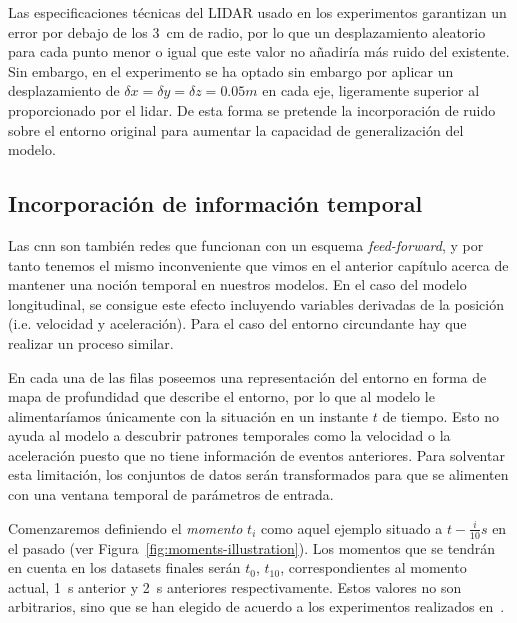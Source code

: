 Las especificaciones técnicas del LIDAR usado en los experimentos garantizan un error por debajo de los \SI{3}{\cm} de radio, por lo que un desplazamiento aleatorio para cada punto menor o igual que este valor no añadiría más ruido del existente. Sin embargo, en el experimento se ha optado sin embargo por aplicar un desplazamiento de $\delta x = \delta y = \delta z = 0.05m$ en cada eje, ligeramente superior al proporcionado por el lidar. De esta forma se pretende la incorporación de ruido sobre el entorno original para aumentar la capacidad de generalización del modelo.

\subsection{Incorporación de información temporal}

Las \ac{cnn} son también redes que funcionan con un esquema \textit{feed-forward}, y por tanto tenemos el mismo inconveniente que vimos en el anterior capítulo acerca de mantener una noción temporal en nuestros modelos. En el caso del modelo longitudinal, se consigue este efecto incluyendo variables derivadas de la posición (i.e. velocidad y aceleración). Para el caso del entorno circundante hay que realizar un proceso similar.

En cada una de las filas poseemos una representación del entorno en forma de mapa de profundidad que describe el entorno, por lo que al modelo le alimentaríamos únicamente con la situación en un instante $t$ de tiempo. Esto no ayuda al modelo a descubrir patrones temporales como la velocidad o la aceleración puesto que no tiene información de eventos anteriores. Para solventar esta limitación, los conjuntos de datos serán transformados para que se alimenten con una ventana temporal de parámetros de entrada.

Comenzaremos definiendo el \textit{momento} $t_i$ como aquel ejemplo situado a $t - \frac{i}{10}s$ en el pasado (ver Figura~\ref{fig:moments-illustration}). Los momentos que se tendrán en cuenta en los datasets finales serán $t_0$, $t_10$, correspondientes al momento actual, \SI{1}{\second} anterior y \SI{2}{\second} anteriores respectivamente. Estos valores no son arbitrarios, sino que se han elegido de acuerdo a los experimentos realizados en~\cite{EL PAPER CUANDO NOS LO PUBLIQUEN}.

